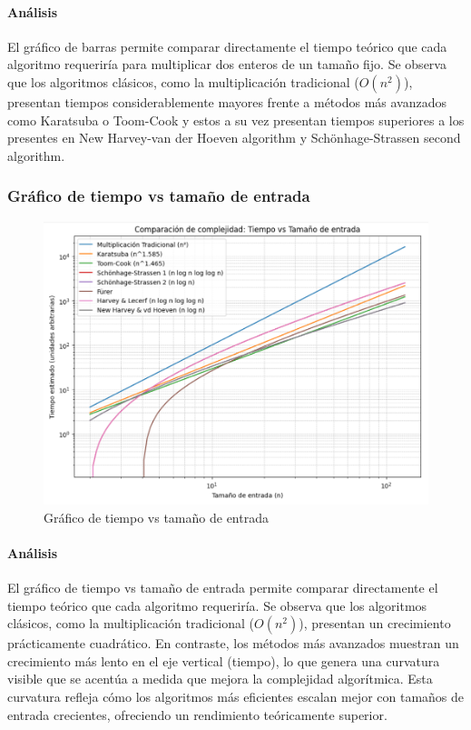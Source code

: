 \paragraph{Análisis} 
El gráfico de barras permite comparar directamente el tiempo teórico que cada algoritmo requeriría para multiplicar dos enteros de un tamaño fijo. Se observa que los algoritmos clásicos, como la multiplicación tradicional (\(O(n^2)\)), presentan tiempos considerablemente mayores frente a métodos más avanzados como Karatsuba o Toom-Cook y estos a su vez presentan tiempos superiores a los presentes en New Harvey-van der Hoeven algorithm y Schönhage-Strassen second algorithm.

\clearpage

\subsubsection{Gráfico de tiempo vs tamaño de entrada}

\begin{figure}[!ht]
    \centering
    \includegraphics[scale=0.7]{figures/graficotvst.png}
    \caption{Gráfico de tiempo vs tamaño de entrada}
    \label{fig:chart_a}
\end{figure}

\paragraph{Análisis}
El gráfico de tiempo vs tamaño de entrada permite comparar directamente el tiempo teórico que cada algoritmo requeriría. Se observa que los algoritmos clásicos, como la multiplicación tradicional (\(O(n^2)\)), presentan un crecimiento prácticamente cuadrático. En contraste, los métodos más avanzados muestran un crecimiento más lento en el eje vertical (tiempo), lo que genera una curvatura visible que se acentúa a medida que mejora la complejidad algorítmica. Esta curvatura refleja cómo los algoritmos más eficientes escalan mejor con tamaños de entrada crecientes, ofreciendo un rendimiento teóricamente superior.

